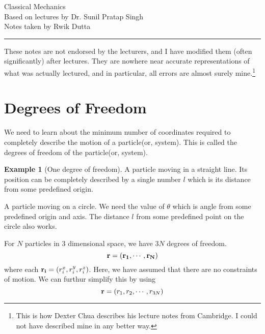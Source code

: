 \documentclass[10pt, a4paper]{extarticle}
\theoremstyle{definition}
\newtheorem{eg}{Example}
\begin{document}
\begin{center}
	\fontsize{25}{60}\selectfont Classical Mechanics \\
	\large Based on lectures by Dr. Sunil Pratap Singh\\
	Notes taken by Rwik Dutta
\end{center}
\hrule
\begin{center}
	These notes are not endorsed by the lecturers, and I have modified them (often
	significantly) after lectures. They are nowhere near accurate representations of what
	was actually lectured, and in particular, all errors are almost surely mine.\footnote[1]{This is how Dexter Chua describes his lecture notes from Cambridge. I could not have described mine in any better way.}
\end{center}
\tableofcontents

\newpage

\section{Degrees of Freedom}
We need to learn about the minimum number of coordinates required to completely describe the motion of a particle(or, system). This is called the degrees of freedom of the particle(or, system).
\begin{eg}[One degree of freedom]
	A particle moving in a straight line. Its position can be completely described by a single number $l$ which is its distance from some predefined origin.

	A particle moving on a circle. We need the value of $\theta$ which is angle from some predefined origin and axis. The distance $l$ from some predefined point on the circle also works.
\end{eg}

For $N$ particles in 3 dimensional space, we have $3N$ degrees of freedom.
\[\vb{r}=(\vb{r_1},\cdots,\vb{r_N})\] where each $\vb{r_i}=(r^x_i,r^y_i,r^z_i)$. Here, we have assumed that there are no constraints of motion.
We can furthur simplify this by using \[\vb{r}=(r_1,r_2,\cdots,r_{3N})\]
\end{document}
